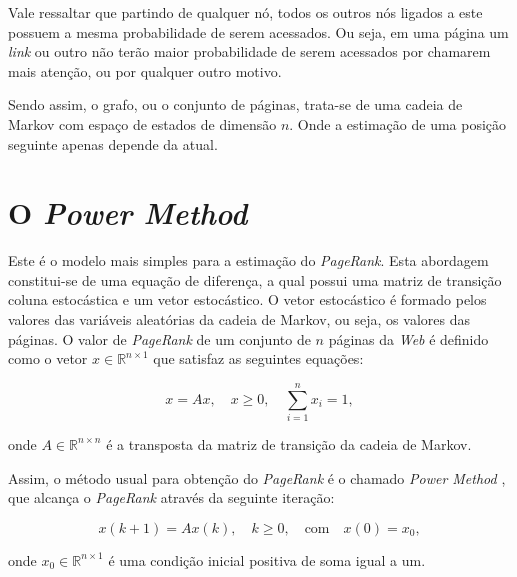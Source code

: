 Vale ressaltar que partindo de qualquer nó, todos os outros nós ligados a este possuem a mesma probabilidade de serem acessados. Ou seja, em uma página um \textit{link} ou outro não terão maior probabilidade de serem acessados por chamarem mais atenção, ou por qualquer outro motivo.

Sendo assim, o grafo, ou o conjunto de páginas, trata-se de uma cadeia de Markov com espaço de estados de dimensão $n$. Onde a estimação de uma posição seguinte apenas depende da atual.




\section{O \textit{Power Method}}%

Este é o modelo mais simples para a estimação do \textit{PageRank}. Esta abordagem constitui-se de uma equação de diferença, a qual possui uma matriz de transição coluna estocástica e um vetor estocástico. O vetor estocástico é formado pelos valores das variáveis aleatórias da cadeia de Markov, ou seja, os valores das páginas. O valor de \textit{PageRank} de um conjunto de $n$ páginas da \textit{Web} é definido como o vetor $x \in \mathbb{R}^{n \times 1}$ que satisfaz as seguintes equações:

\begin{equation}	
x = Ax, \quad x\geq0, \quad \sum^{n}_{i=1} x_{i} = 1, 
\end{equation}

\noindent onde $A \in \mathbb{R}^{n \times n}$ é a transposta da matriz de transição da cadeia de Markov.

Assim, o método usual para obtenção do \textit{PageRank} é o chamado \textit{Power Method} \cite{ishii2014pagerank}, que alcança o \textit{PageRank} através da seguinte iteração:

\begin{equation}
x(k+1) = Ax(k), \quad k\geq0, \quad \text{com} \quad x(0) = x_0,
\end{equation}

\noindent onde $x_0 \in \mathbb{R}^{n \times 1}$ é uma condição inicial positiva de soma igual a um.


